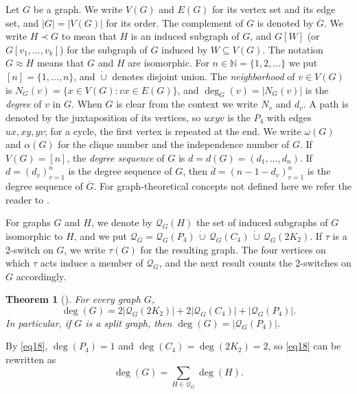 \documentclass[11pt]{article}
\newtheorem{theorem}{Theorem}[section]
\begin{document}
Let $G$ be a graph. We write $V(G)$ and $E(G)$ for its vertex set and
its edge set, and $|G|=|V(G)|$ for its order. The complement of $G$ is
denoted by $\overline{G}$. We write $H\prec G$ to mean that $H$ is an
induced subgraph of $G$, and $G[W]$ (or $G[v_1,\dots,v_k]$) for the
subgraph of $G$ induced by $W\subseteq V(G)$. The notation $G\approx H$
means that $G$ and $H$ are isomorphic. For $n\in\mathbb{N}=\{1,2,\ldots\}$ we put
$[n]=\{1,\dots,n\}$, and $\dot\cup$ denotes disjoint union.
The \emph{neighborhood} of $v\in V(G)$ is
$N_G(v)=\{x\in V(G):vx\in E(G)\}$, and $\deg_G(v)=|N_G(v)|$ is the
\emph{degree} of $v$ in $G$. When $G$ is clear from the context we
write $N_v$ and $d_v$. A path is denoted by the juxtaposition of its
vertices, so $uxyv$ is the $P_4$ with edges $ux,xy,yv$; for a cycle, the first vertex is repeated at the end. We write
$\omega(G)$ and $\alpha(G)$ for the clique number and the independence
number of $G$. 
If $V(G)=[n]$, the \emph{degree sequence} of $G$ is
$d=d(G)=(d_1,\dots,d_n)$. If $d=(d_v)_{v=1}^n$ is the degree
sequence of $G$, then $\overline{d}=(n-1-d_v)_{v=1}^n$ is the degree
sequence of $\overline{G}$. For graph-theoretical concepts not defined here we refer the reader to
\cite{chartrand2010graphs}.

For graphs $G$ and $H$, we denote by $\mathcal{Q}_G(H)$ the set of induced
subgraphs of $G$ isomorphic to $H$, and we put $\mathcal{Q}_G=\mathcal{Q}_G(P_4)\,\dot\cup\,\mathcal{Q}_G(C_4)\,\dot\cup\,\mathcal{Q}_G(2K_2)$.
If $\tau$ is a 2-switch on $G$, we write $\tau(G)$ for the resulting
graph. The four vertices on which $\tau$ acts induce a member of
$\mathcal{Q}_G$, and the next result counts the 2-switches on $G$ accordingly.

\begin{theorem}[\cite{pastine20252}]
	\label{degreeofG}
	For every graph $G$,
	\begin{equation}
		\label{eq18}
		\deg(G)=2|\mathcal{Q}_G (2K_2 )|+2|\mathcal{Q}_G (C_4 )|+|\mathcal{Q}_G (P_4 )|.
	\end{equation}
	In particular, if $G$ is a split graph, then $\deg(G)=|\mathcal{Q}_G (P_4 )|$.
\end{theorem}

By \eqref{eq18}, $\deg(P_4)=1$ and $\deg(C_4)=\deg(2K_2)=2$, so
\eqref{eq18} can be rewritten as
\begin{equation}
	\label{deg.como.suma}
	\deg(G)=\sum_{H\in \mathcal{Q}_G}\deg(H).
\end{equation}
\end{document}
